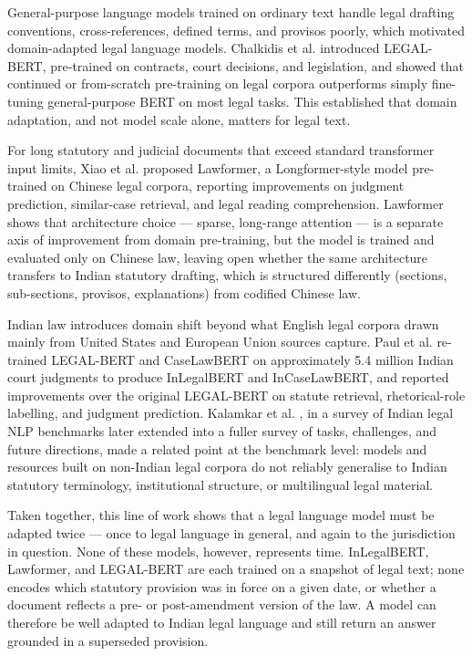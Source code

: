 \label{sec:2-3-1}

General-purpose language models trained on ordinary text handle legal drafting conventions, cross-references, defined terms, and provisos poorly, which motivated domain-adapted legal language models. Chalkidis et al. \cite{chalkidis2020legalbert} introduced LEGAL-BERT, pre-trained on contracts, court decisions, and legislation, and showed that continued or from-scratch pre-training on legal corpora outperforms simply fine-tuning general-purpose BERT on most legal tasks. This established that domain adaptation, and not model scale alone, matters for legal text.

For long statutory and judicial documents that exceed standard transformer input limits, Xiao et al. \cite{xiao2021lawformer} proposed Lawformer, a Longformer-style model pre-trained on Chinese legal corpora, reporting improvements on judgment prediction, similar-case retrieval, and legal reading comprehension. Lawformer shows that architecture choice — sparse, long-range attention — is a separate axis of improvement from domain pre-training, but the model is trained and evaluated only on Chinese law, leaving open whether the same architecture transfers to Indian statutory drafting, which is structured differently (sections, sub-sections, provisos, explanations) from codified Chinese law.

Indian law introduces domain shift beyond what English legal corpora drawn mainly from United States and European Union sources capture. Paul et al. \cite{paul2023inlegalbert} re-trained LEGAL-BERT and CaseLawBERT on approximately 5.4 million Indian court judgments to produce InLegalBERT and InCaseLawBERT, and reported improvements over the original LEGAL-BERT on statute retrieval, rhetorical-role labelling, and judgment prediction. Kalamkar et al. \cite{kalamkar2021survey}, in a survey of Indian legal NLP benchmarks later extended into a fuller survey of tasks, challenges, and future directions, made a related point at the benchmark level: models and resources built on non-Indian legal corpora do not reliably generalise to Indian statutory terminology, institutional structure, or multilingual legal material.

Taken together, this line of work shows that a legal language model must be adapted twice — once to legal language in general, and again to the jurisdiction in question. None of these models, however, represents time. InLegalBERT, Lawformer, and LEGAL-BERT are each trained on a snapshot of legal text; none encodes which statutory provision was in force on a given date, or whether a document reflects a pre- or post-amendment version of the law. A model can therefore be well adapted to Indian legal language and still return an answer grounded in a superseded provision.


